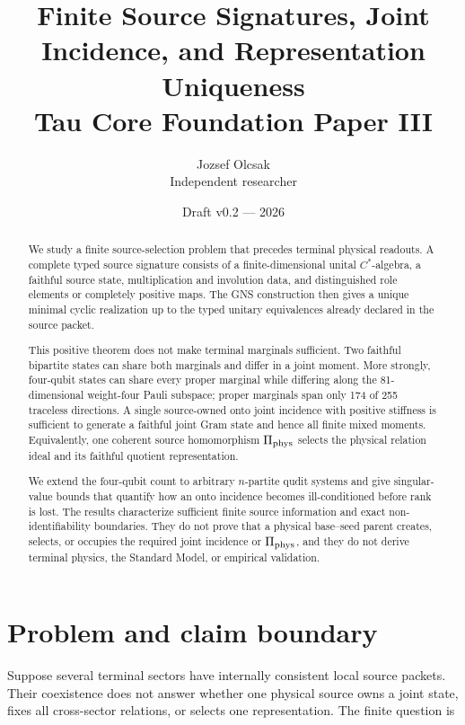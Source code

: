 \documentclass[11pt]{article}
\title{\textbf{Finite Source Signatures, Joint Incidence, and Representation Uniqueness}\\
\large Tau Core Foundation Paper III}
\author{Jozsef Olcsak\\\small Independent researcher}
\date{Draft v0.2 --- 2026}
\begin{document}
\maketitle
\begin{abstract}
We study a finite source-selection problem that precedes terminal physical
readouts.  A complete typed source signature consists of a finite-dimensional
unital \(C^*\)-algebra, a faithful source state, multiplication and involution
data, and distinguished role elements or completely positive maps.  The GNS
construction then gives a unique minimal cyclic realization up to the typed
unitary equivalences already declared in the source packet.

This positive theorem does not make terminal marginals sufficient.  Two
faithful bipartite states can share both marginals and differ in a joint
moment.  More strongly, four-qubit states can share every proper marginal
while differing along the 81-dimensional weight-four Pauli subspace; proper
marginals span only 174 of 255 traceless directions.  A single source-owned
onto joint incidence with positive stiffness is sufficient to generate a
faithful joint Gram state and hence all finite mixed moments.  Equivalently,
one coherent source homomorphism \(\Pi_{\rm phys}\) selects the physical
relation ideal and its faithful quotient representation.

We extend the four-qubit count to arbitrary \(n\)-partite qudit systems and
give singular-value bounds that quantify how an onto incidence becomes
ill-conditioned before rank is lost.  The results characterize sufficient
finite source information and exact non-identifiability boundaries.  They do
not prove that a physical base--seed parent creates, selects, or occupies the
required joint incidence or \(\Pi_{\rm phys}\), and they do not derive
terminal physics, the Standard Model, or empirical validation.
\end{abstract}
\tableofcontents
\clearpage

\section{Problem and claim boundary}

Suppose several terminal sectors have internally consistent local source
packets.  Their coexistence does not answer whether one physical source owns a
joint state, fixes all cross-sector relations, or selects one representation.
The finite question is
\begin{center}
\end{center}
\end{document}
